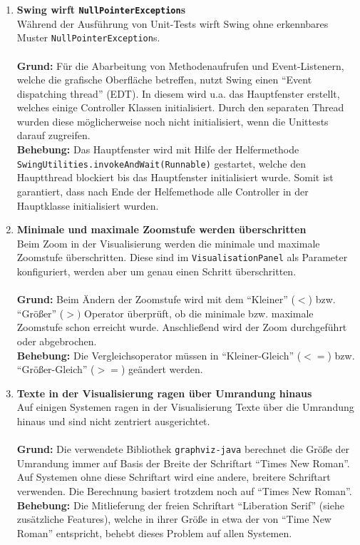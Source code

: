 \documentclass[parskip=full,11pt,twoside]{scrartcl}
\begin{document}
\begin{enumerate}[label=\#\arabic*]
  \item \textbf{Swing wirft \texttt{NullPointerException}s}\\
        Während der Ausführung von Unit-Tests wirft Swing ohne erkennbares Muster \texttt{NullPointerException}s.\\\\
        \textbf{Grund:} Für die Abarbeitung von Methodenaufrufen und Event-Listenern, welche die grafische Oberfläche betreffen, nutzt Swing einen \enquote{Event dispatching thread} (EDT). In diesem wird u.a. das Hauptfenster erstellt, welches einige Controller Klassen initialisiert. Durch den separaten Thread wurden diese möglicherweise noch nicht initialisiert, wenn die Unittests darauf zugreifen.\\
        \textbf{Behebung:} Das Hauptfenster wird mit Hilfe der Helfermethode \texttt{SwingUtilities.invokeAndWait(Runnable)} gestartet, welche den Hauptthread blockiert bis das Hauptfenster initialisiert wurde. Somit ist garantiert, dass nach Ende der Helfemethode alle Controller in der Hauptklasse initialisiert wurden.

  \item \textbf{Minimale und maximale Zoomstufe werden überschritten}\\
        Beim Zoom in der Visualisierung werden die minimale und maximale Zoomstufe überschritten. Diese sind im \texttt{VisualisationPanel} als Parameter konfiguriert, werden aber um genau einen Schritt überschritten.\\\\
        \textbf{Grund:} Beim Ändern der Zoomstufe wird mit dem \enquote{Kleiner} ($<$) bzw. \enquote{Größer} ($>)$ Operator überprüft, ob die minimale bzw. maximale Zoomstufe schon erreicht wurde. Anschließend wird der Zoom durchgeführt oder abgebrochen.\\
        \textbf{Behebung:} Die Vergleichsoperator müssen in \enquote{Kleiner-Gleich} ($<=$) bzw. \enquote{Größer-Gleich} ($>=$) geändert werden.

  \item \textbf{Texte in der Visualisierung ragen über Umrandung hinaus}\\
        Auf einigen Systemen ragen in der Visualisierung Texte über die Umrandung hinaus und sind nicht zentriert ausgerichtet.\\\\
        \textbf{Grund:} Die verwendete Bibliothek \texttt{graphviz-java} berechnet die Größe der Umrandung immer auf Basis der Breite der Schriftart \enquote{Times New Roman}. Auf Systemen ohne diese Schriftart wird eine andere, breitere Schriftart verwenden. Die Berechnung basiert trotzdem noch auf \enquote{Times New Roman}.\\
        \textbf{Behebung:} Die Mitlieferung der freien Schriftart \enquote{Liberation Serif} (siehe zusätzliche Features), welche in ihrer Größe in etwa der von \enquote{Time New Roman} entspricht, behebt dieses Problem auf allen Systemen. 
\end{enumerate}
\end{document}

